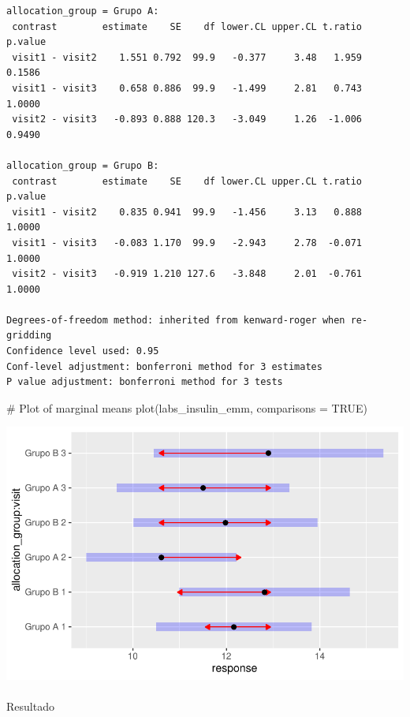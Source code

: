 \documentclass[
  12pt,
]{article}
\makeatletter
\let\oldparagraph\paragraph
\renewcommand{\paragraph}{
    \@ifstar
      \xxxParagraphStar
      \xxxParagraphNoStar
  }
\newcommand{\xxxParagraphStar}[1]{\oldparagraph*{#1}\mbox{}}
\newcommand{\xxxParagraphNoStar}[1]{\oldparagraph{#1}\mbox{}}
\newenvironment{Shaded}{\begin{snugshade}}{\end{snugshade}}
\newcommand{\AttributeTok}[1]{\textcolor[rgb]{0.40,0.45,0.13}{#1}}
\newcommand{\CommentTok}[1]{\textcolor[rgb]{0.37,0.37,0.37}{#1}}
\newcommand{\ConstantTok}[1]{\textcolor[rgb]{0.56,0.35,0.01}{#1}}
\newcommand{\FunctionTok}[1]{\textcolor[rgb]{0.28,0.35,0.67}{#1}}
\newcommand{\NormalTok}[1]{\textcolor[rgb]{0.00,0.23,0.31}{#1}}
\makeatother
\begin{document}
\begin{verbatim}
allocation_group = Grupo A:
 contrast        estimate    SE    df lower.CL upper.CL t.ratio p.value
 visit1 - visit2    1.551 0.792  99.9   -0.377     3.48   1.959  0.1586
 visit1 - visit3    0.658 0.886  99.9   -1.499     2.81   0.743  1.0000
 visit2 - visit3   -0.893 0.888 120.3   -3.049     1.26  -1.006  0.9490

allocation_group = Grupo B:
 contrast        estimate    SE    df lower.CL upper.CL t.ratio p.value
 visit1 - visit2    0.835 0.941  99.9   -1.456     3.13   0.888  1.0000
 visit1 - visit3   -0.083 1.170  99.9   -2.943     2.78  -0.071  1.0000
 visit2 - visit3   -0.919 1.210 127.6   -3.848     2.01  -0.761  1.0000

Degrees-of-freedom method: inherited from kenward-roger when re-gridding 
Confidence level used: 0.95 
Conf-level adjustment: bonferroni method for 3 estimates 
P value adjustment: bonferroni method for 3 tests 
\end{verbatim}

\begin{Shaded}
\begin{Highlighting}[]
\CommentTok{\# Plot of marginal means}
\FunctionTok{plot}\NormalTok{(labs\_insulin\_emm, }\AttributeTok{comparisons =} \ConstantTok{TRUE}\NormalTok{)}
\end{Highlighting}
\end{Shaded}

\includegraphics{Outcomes_files/figure-pdf/labs_insulin_sens_emm-1.pdf}

\paragraph{Resultado}\label{resultado-10}
\end{document}
